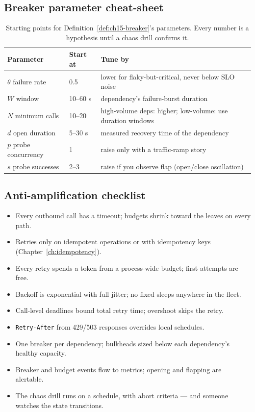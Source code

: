 \subsection*{Breaker parameter cheat-sheet}
\begin{table}[h]
  \centering
  \small
  \begin{tabularx}{\textwidth}{l l X}
    \toprule
    \textbf{Parameter} & \textbf{Start at} & \textbf{Tune by} \\
    \midrule
    $\theta$ failure rate & 0.5 & lower for flaky-but-critical, never below SLO noise \\
    $W$ window & 10--60 s & dependency's failure-burst duration \\
    $N$ minimum calls & 10--20 & high-volume deps: higher; low-volume: use duration windows \\
    $d$ open duration & 5--30 s & measured recovery time of the dependency \\
    $p$ probe concurrency & 1 & raise only with a traffic-ramp story \\
    $s$ probe successes & 2--3 & raise if you observe flap (open/close oscillation) \\
    \bottomrule
  \end{tabularx}
  \caption{Starting points for Definition~\ref{def:ch15-breaker}'s
  parameters. Every number is a hypothesis until a chaos drill confirms it.}
  \label{tab:ch15-breaker-cheatsheet}
\end{table}

\subsection*{Anti-amplification checklist}
\begin{itemize}
  \item[$\square$] Every outbound call has a timeout; budgets shrink toward
        the leaves on every path.
  \item[$\square$] Retries only on idempotent operations or with
        idempotency keys (Chapter~\ref{ch:idempotency}).
  \item[$\square$] Every retry spends a token from a process-wide budget;
        first attempts are free.
  \item[$\square$] Backoff is exponential with full jitter; no fixed
        sleeps anywhere in the fleet.
  \item[$\square$] Call-level deadlines bound total retry time; overshoot
        skips the retry.
  \item[$\square$] \texttt{Retry-After} from 429/503 responses overrides
        local schedules.
  \item[$\square$] One breaker per dependency; bulkheads sized below each
        dependency's healthy capacity.
  \item[$\square$] Breaker and budget events flow to metrics; opening and
        flapping are alertable.
  \item[$\square$] The chaos drill runs on a schedule, with abort criteria
        --- and someone watches the state transitions.
\end{itemize}


